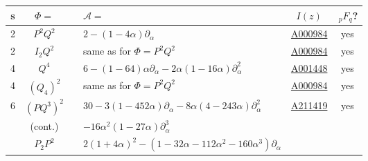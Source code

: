 \documentclass[nofootinbib,preprint]{revtex4-1}
\begin{document}
\begin{table}[p]
\begin{center}
\label{tab:TrigPolys}
\begin{tabularx}{\textwidth}{ c | c | c l | c   | c  }
\hline \hline
 \hspace{0.1cm}s\hspace{0.1cm}  & \hspace{0.4cm} $\Phi=$ \hspace{0.4cm} & \hspace{.2cm} 
 &  $\mathcal{A}=$ \hspace{9cm} 
 & $I(z)$ &  \hspace{0.03cm} $\,_pF_q$? \hspace{0.03cm}     \\
\hline 
2           &  $P^2 Q^2$  && $2-(1-4\alpha)\partial_{\alpha}$  
            &\hspace{0.1cm} \href{https://oeis.org/A000984}{A000984} \hspace{0.1cm}
            &   yes \\
2           &  $I_2 Q^2$   && same as for $\Phi=P^2 Q^2$
            & \href{https://oeis.org/A000984}{A000984} 
            &   yes \\
4           &  $Q^4$      && $6-(1-64)\alpha\partial_{\alpha}
                             - 2 \alpha (1 - 16 \alpha)\partial_{\alpha}^2$  
            & \href{https://oeis.org/A001448}{A001448} 
            &  yes \\
4           &  $(Q_4)^2$       && same as for $\Phi=P^2 Q^2$ 
            & \href{https://oeis.org/A000984}{A000984} 
            &  yes  \\            
6           &  $(P Q^3)^2$    && $30 - 3 (1- 452 \alpha)\partial_{\alpha}
                               - 8 \alpha (4 - 243 \alpha)\partial_{\alpha}^2$ 
            & \href{https://oeis.org/A211419}{A211419} 
            &  yes \\
            & \tiny (cont.) && \hspace{0.5cm} $ -16 \alpha^2 (1 - 27 \alpha)\partial_{\alpha}^3$  &  &    \\            
            &  $P_2 P^2$    && $2(1 + 4 \alpha)^2 
                             -(1 - 32 \alpha -112 \alpha^2 - 160 \alpha^3)\partial_{\alpha}$ 

\end{tabularx}
\end{center}
\end{table}
\end{document}
